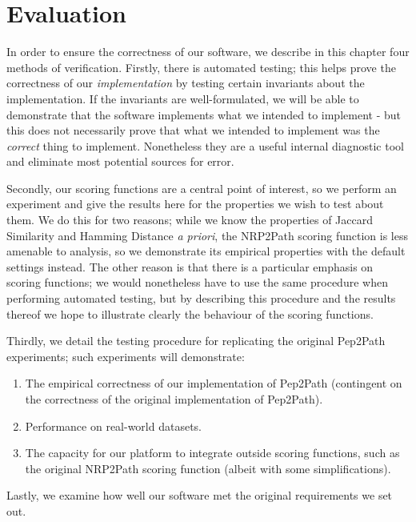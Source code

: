 \documentclass{l4proj}
\begin{document}
\chapter{Evaluation} 

In order to ensure the correctness of our software, we describe in this chapter four methods of verification. Firstly, there is automated testing; this helps prove the correctness of our \textit{implementation} by testing certain invariants about the implementation. If the invariants are well-formulated, we will be able to demonstrate that the software implements what we intended to implement - but this does not necessarily prove that what we intended to implement was the \textit{correct} thing to implement. Nonetheless they are a useful internal diagnostic tool and eliminate most potential sources for error.

Secondly, our scoring functions are a central point of interest, so we perform an experiment and give the results here for the properties we wish to test about them. We do this for two reasons; while we know the properties of Jaccard Similarity and Hamming Distance \textit{a priori}, the NRP2Path scoring function is less amenable to analysis, so we demonstrate its empirical properties with the default settings instead. The other reason is that there is a particular emphasis on scoring functions; we would nonetheless have to use the same procedure when performing automated testing, but by describing this procedure and the results thereof we hope to illustrate clearly the behaviour of the scoring functions.

Thirdly, we detail the testing procedure for replicating the original Pep2Path experiments; such experiments will demonstrate:
\begin{enumerate}
	\item The empirical correctness of our implementation of Pep2Path (contingent on the correctness of the original implementation of Pep2Path).
	\item Performance on real-world datasets.
	\item The capacity for our platform to integrate outside scoring functions, such as the original NRP2Path scoring function (albeit with some 
		simplifications).
\end{enumerate}

Lastly, we examine how well our software met the original requirements we set out.
\end{document}
